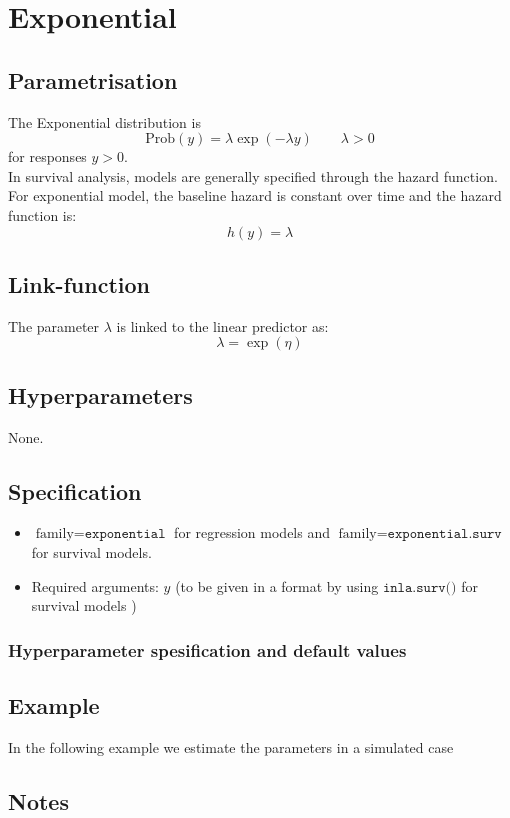 \documentclass[a4paper,11pt]{article}
\begin{document}
\section*{Exponential}

\subsection*{Parametrisation}

The Exponential distribution is
\begin{displaymath}
    \text{Prob}(y) = \lambda \exp(-\lambda y)\qquad \lambda > 0
\end{displaymath}
for responses $y>0$.\\
In survival analysis, models are generally specified through the
hazard function. For exponential model, the baseline hazard is
constant over time and the hazard function is:
\begin{displaymath}
    h(y)  = \lambda
\end{displaymath}

\subsection*{Link-function}
The parameter $\lambda$ is linked to the linear predictor as:
\[
\lambda = \exp(\eta)
\]

\subsection*{Hyperparameters}

None.

\subsection*{Specification}

\begin{itemize}
\item $\text{family}=\texttt{exponential}$ for regression models and 
 $\text{family}=\texttt{exponential.surv}$ for survival models.
\item Required arguments: $y$ (to be given in a format by using
    $\texttt{inla.surv()}$ for survival models )
\end{itemize}

\subsubsection*{Hyperparameter spesification and default values}



\subsection*{Example}

In the following example we estimate the parameters in a simulated
case%


\subsection*{Notes}
\end{document}
